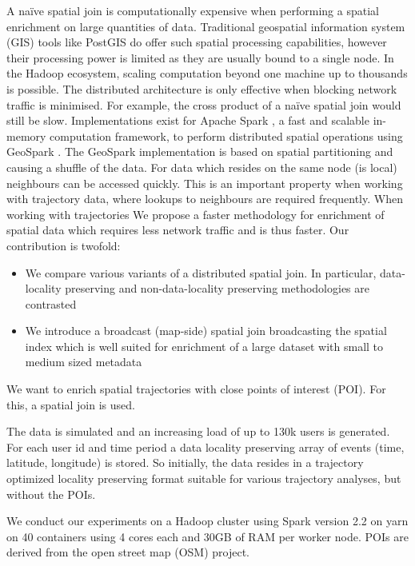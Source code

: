 \documentclass[conference]{IEEEtran}
\begin{document}
A naïve spatial join is
computationally expensive when performing a spatial enrichment on large quantities of data. Traditional geospatial information system (GIS) tools like PostGIS do offer such spatial processing capabilities,
however their processing power is limited as they are usually bound to a single node.
In the Hadoop ecosystem, scaling computation beyond one machine up to thousands is possible.
The distributed architecture is only effective when blocking network traffic is minimised. For example, the cross product of a naïve spatial join would still be slow.
Implementations exist for Apache Spark \cite{Zaharia2012}, a fast and scalable in-memory computation framework, to perform distributed spatial operations using GeoSpark \cite{Yu2019}.
The GeoSpark implementation is based on spatial partitioning and causing a shuffle of the data.
For data which resides on the same node (is local) neighbours can be accessed quickly.
This is an important property when working with trajectory data, where lookups to neighbours are required frequently.
When working with trajectories
We propose a faster methodology for enrichment of spatial data which requires less network traffic and is thus faster. Our contribution is twofold:
\begin{itemize}
  \item We compare various variants of a distributed spatial join. In particular, data-locality preserving and non-data-locality preserving methodologies are contrasted
  \item We introduce a broadcast (map-side) spatial join broadcasting the spatial index which is well suited for enrichment of a large dataset with small to medium sized metadata
\end{itemize}


We want to enrich spatial trajectories with close points of interest (POI). For this, a spatial join is used.

The data is simulated and an increasing load of up to 130k users is generated.
For each user id and time period a data locality preserving array of events (time, latitude, longitude) is stored.
So initially, the data resides in a trajectory optimized locality preserving format suitable for various trajectory analyses, but without the POIs.

We conduct our experiments on a Hadoop cluster using Spark version 2.2 on yarn on 40 containers using 4 cores each and 30GB of RAM per worker node. POIs are derived from the open street map (OSM) project.
\end{document}
